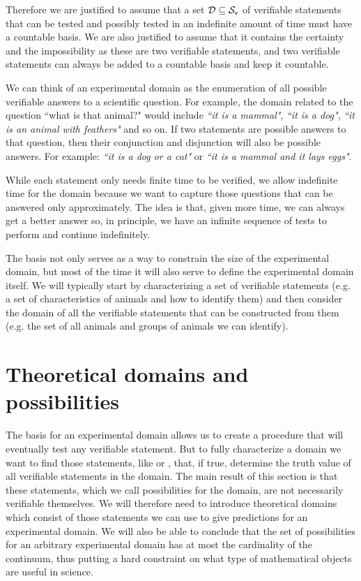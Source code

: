 \documentclass[11pt,letterpaper,fleqn]{memoir} %
\begin{document}
\begin{mathSection}
\begin{justification}
	Therefore we are justified to assume that a set $\mathcal{D} \subseteq \mathcal{S}_\textsf{v}$ of verifiable statements that can be tested and possibly tested in an indefinite amount of time must have a countable basis. We are also justified to assume that it contains the certainty and the impossibility as these are two verifiable statements, and two verifiable statements can always be added to a countable basis and keep it countable.
\end{justification}
\end{mathSection}

We can think of an experimental domain as the enumeration of all possible verifiable answers to a scientific question. For example, the domain related to the question ``what is that animal?" would include \emph{``it is a mammal"}, \emph{``it is a dog"}, \emph{``it is an animal with feathers"} and so on. If two statements are possible answers to that question, then their conjunction and disjunction will also be possible answers. For example: \emph{``it is a dog or a cat"} or \emph{``it is a mammal and it lays eggs"}.

While each statement only needs finite time to be verified, we allow indefinite time for the domain because we want to capture those questions that can be answered only approximately. The idea is that, given more time, we can always get a better answer so, in principle, we have an infinite sequence of tests to perform and continue indefinitely.

The basis not only serves as a way to constrain the size of the experimental domain, but most of the time it will also serve to define the experimental domain itself. We will typically start by characterizing a set of verifiable statements (e.g. a set of characteristics of animals and how to identify them) and then consider the domain of all the verifiable statements that can be constructed from them (e.g. the set of all animals and groups of animals we can identify).

\section{Theoretical domains and possibilities}

The basis for an experimental domain allows us to create a procedure that will eventually test any verifiable statement. But to fully characterize a domain we want to find those statements, like  or , that, if true, determine the truth value of all verifiable statements in the domain. The main result of this section is that these statements, which we call possibilities for the domain, are not necessarily verifiable themselves. We will therefore need to introduce theoretical domains which consist of those statements we can use to give predictions for an experimental domain. We will also be able to conclude that the set of possibilities for an arbitrary experimental domain has at most the cardinality of the continuum, thus putting a hard constraint on what type of mathematical objects are useful in science.
\end{document}
